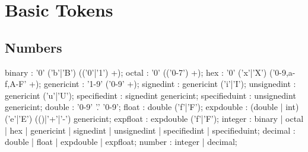 \documentclass[a4paper]{book}
\begin{document}

\chapter{Basic Tokens}
\section{Numbers}
\begin{rail}
    binary : '0' ('b'|'B') (('0'|'1') +);
    octal : '0' (('0-7') +);
    hex : '0' ('x'|'X') ('0-9,a-f,A-F' +);
    genericint : '1-9' ('0-9' +);
    signedint : genericint ('i'|'I');
    unsignedint : genericint ('u'|'U');
    specifiedint : signedint genericint;
    specifieduint : unsignedint genericint;
    double : '0-9' '.' '0-9';
    float : double ('f'|'F');
    expdouble : (double | int) ('e'|'E') (()|'+'|'-') genericint;
    expfloat : expdouble ('f'|'F');
    integer : binary | octal | hex | genericint | signedint | unsignedint | specifiedint | specifieduint;
    decimal : double | float | expdouble | expfloat;
    number : integer | decimal;
\end{rail}
\end{document}
